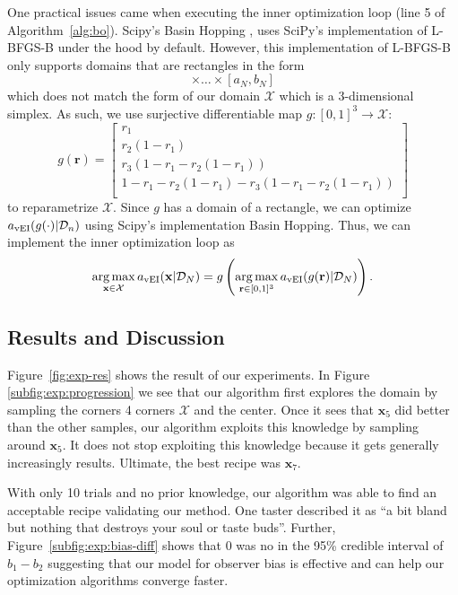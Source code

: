 One practical issues came when executing the inner optimization loop (line 5 of Algorithm~\ref{alg:bo}).
Scipy's Basin Hopping \cite{scipy, wales1997}, uses SciPy's implementation of L-BFGS-B under the hood by default.
However, this implementation of L-BFGS-B only supports domains that are rectangles in the form
\begin{equation*}[a_1, b_1] \times \ldots \times [a_N, b_N]
\end{equation*}
which does not match the form of our domain $\mathcal{X}$ which is a 3-dimensional simplex.
As such, we use surjective differentiable map $g: [0, 1]^3 \to \mathcal{X}$:
\begin{equation*}
    g(\mathbf{r}) =
    \begin{bmatrix}
        r_1 \\
        r_2(1 - r_1) \\
        r_3(1 - r_1 - r_2(1 - r_1)) \\
           1 - r_1 - r_2(1 - r_1) - r_3(1 - r_1 - r_2(1 - r_1)) \\
    \end{bmatrix}
\end{equation*}
to reparametrize $\mathcal{X}$.
Since $g$ has a domain of a rectangle, we can optimize $a_{\mathrm{vEI}}(g(\cdot) | \mathcal{D}_n)$ using Scipy's implementation Basin Hopping.
Thus, we can implement the inner optimization loop as
\begin{equation*}
    \operatorname*{arg\,max}_{\mathbf{x} \in \mathcal{X}} a_{\mathrm{vEI}}(\mathbf{x} | \mathcal{D}_N)
    =
    g\left(\operatorname*{arg\,max}_{\mathbf{r} \in [0, 1]^3} a_{\mathrm{vEI}}(g(\mathbf{r}) | \mathcal{D}_N)\right).
\end{equation*}

\subsection{Results and Discussion}

Figure~\ref{fig:exp-res} shows the result of our experiments.
In Figure \ref{subfig:exp:progression} we see that our algorithm first explores the domain by sampling the corners 4 corners $\mathcal{X}$ and the center.
Once it sees that $\mathbf{x}_5$ did better than the other samples, our algorithm exploits this knowledge by sampling around $\mathbf{x}_5$.
It does not stop exploiting this knowledge because it gets generally increasingly results.
Ultimate, the best recipe was $\mathbf{x}_7$.

With only 10 trials and no prior knowledge, our algorithm was able to find an acceptable recipe validating our method.
One taster described it as ``a bit bland but nothing that destroys your soul or taste buds''.
Further, Figure~\ref{subfig:exp:bias-diff} shows that 0 was no in the 95\% credible interval of $b_1 - b_2$
suggesting that our model for observer bias is effective and can help our optimization algorithms converge faster.

